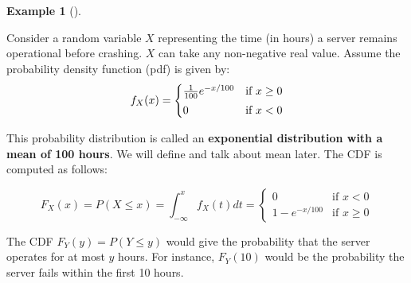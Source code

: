 \documentclass[
  letterpaper,
  DIV=11,
  numbers=noendperiod]{scrreport}
\theoremstyle{definition}
\newtheorem{example}{Example}[chapter]
\theoremstyle{plain}
\theoremstyle{plain}
\theoremstyle{definition}
\theoremstyle{remark}
\begin{document}
\begin{tcolorbox}[enhanced jigsaw, opacitybacktitle=0.6, bottomtitle=1mm, opacityback=0, toprule=.15mm, colbacktitle=quarto-callout-note-color!10!white, colback=white, left=2mm, title={CDF of a continuous random variable}, breakable, rightrule=.15mm, leftrule=.75mm, titlerule=0mm, colframe=quarto-callout-note-color-frame, arc=.35mm, coltitle=black, toptitle=1mm, bottomrule=.15mm]

\begin{example}[]\protect\hypertarget{exm-cdf-continuous}{}\label{exm-cdf-continuous}

Consider a random variable \(X\) representing the time (in hours) a
server remains operational before crashing. \(X\) can take any
non-negative real value. Assume the probability density function (pdf)
is given by: \[
f_X(x)=
\begin{cases}
\frac{1}{100} e^{-x/100} & \text{if } x \ge 0 \\
\rule{0in}{3ex}0 & \text{if } x < 0
\end{cases}
\]

This probability distribution is called an \textbf{exponential
distribution with a mean of 100 hours}. We will define and talk about
mean later. The CDF is computed as follows:

\[
F_X(x) = P(X \le x) = \int_{-\infty}^x f_X(t) dt =
\begin{cases}
0 & \text{if } x < 0 \\
1 - e^{-x/100} & \text{if } x \ge 0
\end{cases}
\]

The CDF \(F_Y(y) = P(Y \le y)\) would give the probability that the
server operates for at most \(y\) hours. For instance, \(F_Y(10)\) would
be the probability the server fails within the first 10 hours.

\end{example}

\end{tcolorbox}
\end{document}

